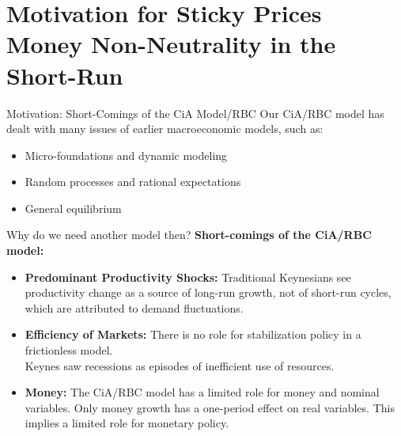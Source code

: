 \documentclass[10pt,c,aspectratio=1610,handout]{beamer}
\begin{document}
\section{Motivation for Sticky Prices\\{\small Money Non-Neutrality in the Short-Run}}%
\begin{frame}{Motivation: Short-Comings of the CiA Model/RBC}%
  Our CiA/RBC model has dealt with many issues of earlier macroeconomic models, such as:
  \begin{small}%
    \begin{itemize}%
      \item[$\blacktriangleright$] Micro-foundations and dynamic modeling%
      \item[$\blacktriangleright$] Random processes and rational expectations%
      \item[$\blacktriangleright$] General equilibrium%
    \end{itemize}%
  \end{small}%
  \vspace*{0.15in}%
  \pause%
  Why do we need another model then? \textbf{Short-comings of the CiA/RBC model:}%
  \pause%
  \begin{small}%
    \begin{itemize}%
      \item[$\blacktriangleright$] \textbf{Predominant Productivity Shocks:} Traditional Keynesians see productivity change as a source of long-run growth, not of short-run cycles, which are attributed to demand fluctuations.%
      \item[$\blacktriangleright$] \textbf{Efficiency of Markets:} There is no role for stabilization policy in a frictionless model.\\Keynes saw recessions as episodes of inefficient use of resources.%
      \item[$\blacktriangleright$] \textbf{Money:} The CiA/RBC model has a limited role for money and nominal variables. Only money growth has a one-period effect on real variables. This implies a limited role for monetary policy.%
    \end{itemize}%
  \end{small}%
\end{frame}%
\end{document}
